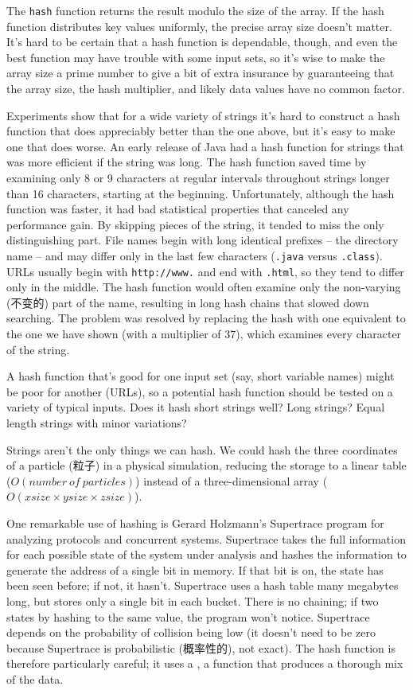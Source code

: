 The \verb'hash' function returns the result modulo the size of the array.
If the hash function distributes key values uniformly, the precise array
size doesn't matter. It's hard to be certain that a hash function is
dependable, though, and even the best function may have trouble with some
input sets, so it's wise to make the array size a prime number to give a
bit of extra insurance by guaranteeing that the array size, the hash
multiplier, and likely data values have no common factor.

Experiments show that for a wide variety of strings it's hard to construct
a hash function that does appreciably better than the one above, but it's
easy to make one  that does worse. An early release of Java had a hash
function for strings that was more efficient if the string was long. The
hash function saved time by examining only 8 or 9 characters at regular
intervals throughout strings longer than 16 characters, starting at the
beginning. Unfortunately, although the hash function was faster, it had bad
statistical properties that canceled any performance gain. By skipping
pieces of the string, it tended to miss the only distinguishing part. File
names begin with long identical prefixes -- the directory name -- and may
differ only in the last few characters (\texttt{.java} versus
\texttt{.class}). URLs usually begin with \texttt{http://www.} and end with
\texttt{.html}, so they tend to differ only in the middle. The hash
function would often examine only the non-varying (不变的) part of the
name, resulting in long hash chains that slowed down searching. The problem
was resolved by replacing the hash with one equivalent to the one we have
shown (with a multiplier of 37), which examines every character of the
string.

A hash function that's good for one input set (say, short variable names)
might be poor for another (URLs), so a potential hash function should be
tested on a variety of typical inputs. Does it hash short strings well?
Long strings? Equal length strings with minor variations?

Strings aren't the only things we can hash. We could hash the three
coordinates of a particle (粒子) in a physical simulation, reducing the
storage to a linear table ($O(number\ of\ particles)$) instead of a
three-dimensional array ($O(xsize \times ysize \times zsize)$).

One remarkable use of hashing is Gerard Holzmann's Supertrace program for
analyzing protocols and concurrent systems. Supertrace takes the full
information for each possible state of the system under analysis and hashes
the information to generate the address of a single bit in memory. If that
bit is on, the state has been seen before; if not, it hasn't. Supertrace
uses a hash table many megabytes long, but stores only a single bit in each
bucket. There is no chaining; if two states  by hashing to
the same value, the program won't notice. Supertrace depends on the
probability of collision being low (it doesn't need to be zero because
Supertrace is probabilistic (概率性的), not exact). The hash function is
therefore particularly careful; it uses a , a
function that produces a thorough mix of the data.

